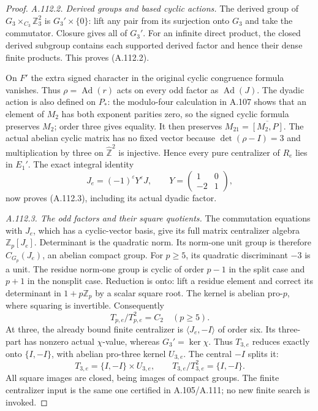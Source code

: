 \begin{proof}
\emph{A.112.2. Derived groups and based cyclic actions.}
The derived group of \(G_3\times_{C_3}\mathbb Z_3^2\) is
\(G_3'\times\{0\}\): lift any pair from its surjection onto \(G_3\)
and take the commutator. Closure gives all of \(G_3'\).
For an infinite direct product, the closed derived subgroup contains
each supported derived factor and hence their dense finite products.
This proves (A.112.2).

On \(F'\) the extra signed character in the original cyclic
congruence formula vanishes. Thus \(\rho=\operatorname{Ad}(r)\)
acts on every odd factor as \(\operatorname{Ad}(J)\).
The dyadic action is also defined on \(P_*\): the modulo-four
calculation in A.107 shows that an element of \(M_2\) has both
exponent parities zero, so the signed cyclic formula preserves
\(M_2\); order three gives equality. It then preserves
\(M_{21}=\overline{[M_2,P]}\).
The actual abelian cyclic matrix has no fixed vector because
\(\det(\rho-I)=3\) and multiplication by three on
\(\widehat{\mathbb Z}^2\) is injective.
Hence every pure centralizer of \(R_e\) lies in \(E_1'\).
The exact integral identity
\[
       J_e=(-1)^\varepsilon Y^\varepsilon J,\qquad
       Y=\begin{pmatrix}1&0\\-2&1\end{pmatrix},
\]
now proves (A.112.3), including its actual dyadic factor.

\emph{A.112.3. The odd factors and their square quotients.}
The commutation equations with \(J_e\), which has a cyclic-vector
basis, give its full matrix centralizer algebra
\(\mathbb Z_p[J_e]\). Determinant is the quadratic norm.
Its norm-one unit group is therefore \(C_{G_p}(J_e)\), an abelian
compact group. For \(p\geq5\), its quadratic discriminant \(-3\)
is a unit. The residue norm-one group is cyclic of order \(p-1\)
in the split case and \(p+1\) in the nonsplit case.
Reduction is onto: lift a residue element and correct its
determinant in \(1+p\mathbb Z_p\) by a scalar square root.
The kernel is abelian pro-\(p\), where squaring is invertible.
Consequently
\[
                         T_{p,e}/T_{p,e}^2=C_2\quad(p\geq5).
 \tag{A.112.8}
\]
At three, the already bound finite centralizer is
\(\langle J_e,-I\rangle\) of order six. Its three-part has nonzero
actual \(\chi\)-value, whereas \(G_3'=\ker\chi\).
Thus \(T_{3,e}\) reduces exactly onto \(\{I,-I\}\), with abelian
pro-three kernel \(U_{3,e}\). The central \(-I\) splits it:
\[
 T_{3,e}=\{I,-I\}\times U_{3,e},\qquad
                         T_{3,e}/T_{3,e}^2=\{I,-I\}.
 \tag{A.112.9}
\]
All square images are closed, being images of compact groups.
The finite centralizer input is the same one certified in
A.105/A.111; no new finite search is invoked.


\end{proof}
